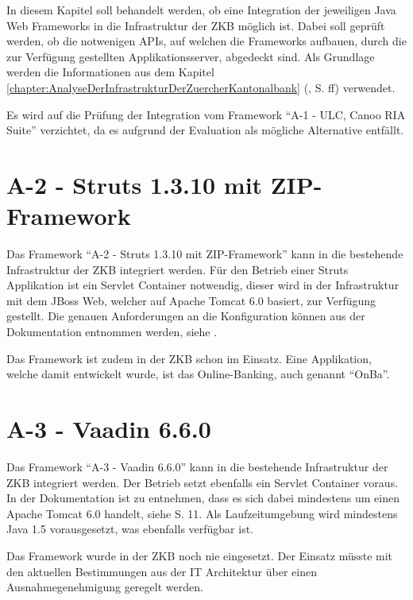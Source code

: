 In diesem Kapitel soll behandelt werden, ob eine Integration der jeweiligen Java
Web Frameworks in die Infrastruktur der \ac{ZKB} möglich ist. Dabei soll geprüft
werden, ob die notwenigen \acp{API}, auf welchen die Frameworks aufbauen, durch
die zur Verfügung gestellten Applikationsserver, abgedeckt sind. Als Grundlage
werden die Informationen aus dem Kapitel
\ref{chapter:AnalyseDerInfrastrukturDerZuercherKantonalbank}
(, S.
\pageref{chapter:AnalyseDerInfrastrukturDerZuercherKantonalbank}ff) verwendet.

Es wird auf die Prüfung der Integration vom Framework ``A-1 - ULC, Canoo RIA
Suite'' verzichtet, da es aufgrund der Evaluation als mögliche Alternative
entfällt.

\section{A-2 - Struts 1.3.10 mit ZIP-Framework}

Das Framework ``A-2 - Struts 1.3.10 mit ZIP-Framework'' kann in die bestehende
Infrastruktur der \ac{ZKB} integriert werden. Für den Betrieb einer Struts
Applikation ist ein Servlet Container notwendig, dieser wird in der
Infrastruktur mit dem JBoss Web, welcher auf Apache Tomcat 6.0 basiert, zur
Verfügung gestellt. Die genauen Anforderungen an die Konfiguration können aus
der Dokumentation entnommen werden, siehe \cite{StrutsDokumentation}.

Das Framework ist zudem in der \ac{ZKB} schon im Einsatz. Eine Applikation,
welche damit entwickelt wurde, ist das Online-Banking, auch genannt ``OnBa''.

\section{A-3 - Vaadin 6.6.0}

Das Framework ``A-3 - Vaadin 6.6.0'' kann in die bestehende
Infrastruktur der \ac{ZKB} integriert werden. Der Betrieb setzt ebenfalls ein
Servlet Container voraus. In der Dokumentation ist zu entnehmen, dass es sich
dabei mindestens um einen Apache Tomcat 6.0 handelt, siehe \cite{BookOfVaadin}
S. 11. Als Laufzeitumgebung wird mindestens Java 1.5 vorausgesetzt, was
ebenfalls verfügbar ist.

Das Framework wurde in der \ac{ZKB} noch nie eingesetzt. Der Einsatz müsste mit
den aktuellen Bestimmungen aus der IT Architektur über einen Ausnahmegenehmigung
geregelt werden.

